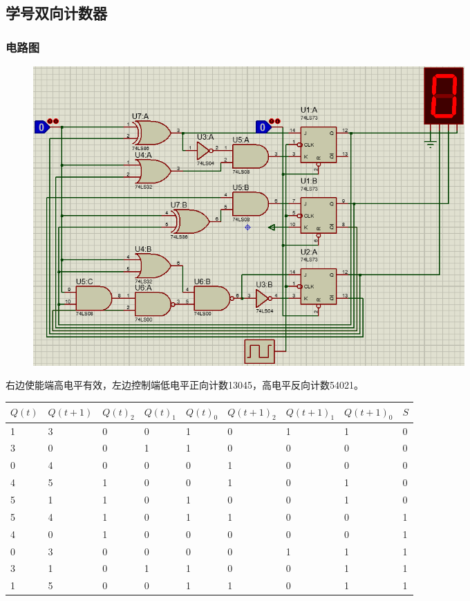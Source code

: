\documentclass[UTF8, a4paper, 11pt]{article}
\begin{document}
\subsection{学号双向计数器}
\subsubsection{电路图}
\begin{figure}[H]
    \centering
    \includegraphics[width=0.8\textwidth]{ex11.2电路图.png}
\end{figure}
右边使能端高电平有效，左边控制端低电平正向计数13045，高电平反向计数54021。
\begin{table}[H]
    \center
\begin{tabular}{|l|l|l|l|l|l|l|l|l|}
\hline
$Q(t)$ & $Q(t+1)$ & $Q(t)_2$ & $Q(t)_1$ & $Q(t)_0$ & $Q(t+1)_2$ & $Q(t+1)_1$ & $Q(t+1)_0$ & $S$ \\ \hline
1      & 3        & 0        & 0        & 1        & 0          & 1          & 1          & 0   \\ \hline
3      & 0        & 0        & 1        & 1        & 0          & 0          & 0          & 0   \\ \hline
0      & 4        & 0        & 0        & 0        & 1          & 0          & 0          & 0   \\ \hline
4      & 5        & 1        & 0        & 0        & 1          & 0          & 1          & 0   \\ \hline
5      & 1        & 1        & 0        & 1        & 0          & 0          & 1          & 0   \\ \hline
5      & 4        & 1        & 0        & 1        & 1          & 0          & 0          & 1   \\ \hline
4      & 0        & 1        & 0        & 0        & 0          & 0          & 0          & 1   \\ \hline
0      & 3        & 0        & 0        & 0        & 0          & 1          & 1          & 1   \\ \hline
3      & 1        & 0        & 1        & 1        & 0          & 0          & 1          & 1   \\ \hline
1      & 5        & 0        & 0        & 1        & 1          & 0          & 1          & 1   \\ \hline
\end{tabular}
\end{table}
\end{document}
